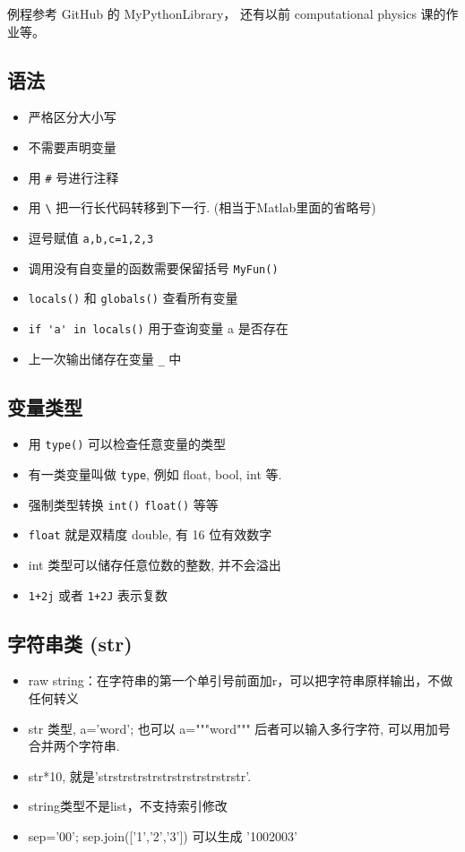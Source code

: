 
\begin{issues}
\issueDraft
\end{issues}

例程参考 GitHub 的 MyPythonLibrary， 还有以前 computational physics 课的作业等。

\subsection{语法}
\begin{itemize}
\item 严格区分大小写
\item 不需要声明变量
\item 用 \verb|#| 号进行注释
\item 用 \verb|\| 把一行长代码转移到下一行. (相当于Matlab里面的省略号)
\item 逗号赋值 \verb`a,b,c=1,2,3`
\item 调用没有自变量的函数需要保留括号  \verb`MyFun()`
\item \verb`locals()` 和 \verb`globals()` 查看所有变量
\item \verb`if 'a' in locals()` 用于查询变量 a 是否存在
\item 上一次输出储存在变量 \verb`_` 中
\end{itemize}

\subsection{变量类型}
\begin{itemize}
\item 用 \verb`type()` 可以检查任意变量的类型
\item 有一类变量叫做 \verb`type`, 例如 float, bool, int 等.
\item 强制类型转换 \verb`int()` \verb`float()` 等等
\item \verb`float` 就是双精度 double, 有 16 位有效数字
\item int 类型可以储存任意位数的整数, 并不会溢出 
\item \verb`1+2j` 或者 \verb`1+2J` 表示复数
\end{itemize}

\subsection{字符串类 (str)}
\begin{itemize}
\item raw string：在字符串的第一个单引号前面加r，可以把字符串原样输出，不做任何转义
\item str 类型, a='word'; 也可以 a="""word""" 后者可以输入多行字符, 可以用加号合并两个字符串.
\item str*10, 就是'strstrstrstrstrstrstrstrstrstr'.
\item string类型不是list，不支持索引修改
\item sep='00'; sep.join(['1','2','3']) 可以生成 '1002003'
\end{itemize}

